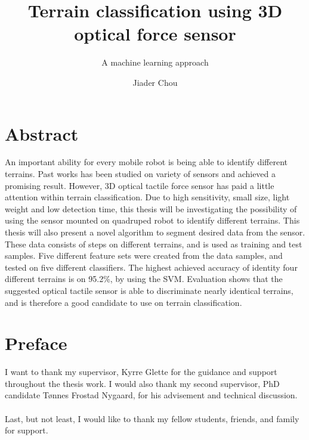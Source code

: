 \documentclass[USenglish]{ifimaster}  %
\title{Terrain classification using 3D optical force sensor}        %
\subtitle{A machine learning approach}
\date{}
\author{Jiader Chou}                      %
\begin{document}
	\ififorside{}
	\frontmatter{}
	\maketitle{}
	
	\frontmatter{}
\chapter*{Abstract}                   %
An important ability for every mobile robot is being able to identify different terrains. Past works has been studied on variety of sensors and achieved a promising result. However, 3D optical tactile force sensor has paid a little attention within terrain classification. Due to high sensitivity, small size, light weight and low detection time, this thesis will be investigating the possibility of using the sensor mounted on quadruped robot to identify different terrains. This thesis will also present a novel algorithm to segment desired data from the sensor. These data consists of steps on different terrains, and is used as training and test samples. Five different feature sets were created from the data samples, and tested on five different classifiers. The highest achieved accuracy of identity four different terrains is on 95.2\%, by using the SVM. Evaluation shows that the suggested optical tactile sensor is able to discriminate nearly identical terrains, and is therefore a good candidate to use on terrain classification. 
\tableofcontents{}
\listoffigures{}
\listoftables{}
	
\chapter*{Preface}                    %
I want to thank my supervisor, Kyrre Glette for the guidance and support throughout the thesis work. I would also thank my second supervisor, PhD candidate Tønnes Frostad Nygaard, for his advisement and technical discussion.
\\
\\
Last, but not least, I would like to thank my fellow students, friends, and family for support.
	

\mainmatter{}
\pagestyle{MyStyle}
\end{document}

